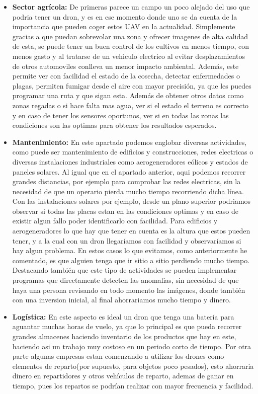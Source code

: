 \begin{itemize}
	\item \textbf{Sector agr\'icola:} De primeras parece un campo un poco alejado del uso que podria tener un dron, y es en ese momento donde uno se da cuenta de la importancia que pueden coger estos UAV en la actualidad. Simplemente gracias a que puedan sobrevolar una zona y ofrecer imagenes de alta calidad de esta, se puede tener un buen control de los cultivos en menos tiempo, con menos gasto y al tratarse de un vehiculo electrico al evitar desplazamientos de otros automoviles conlleva un menor impacto ambiental. Adem\'as, este permite ver con facilidad el estado de la cosecha, detectar enfermedades o plagas, permiten fumigar desde el aire con mayor precisi\'on, ya que les puedes programar una ruta y que sigan esta. Adem\'as de obtener otros datos como zonas regadas o si hace falta mas agua, ver si el estado el terreno es correcto y en caso de tener los sensores oportunos, ver si en todas las zonas las condiciones son las optimas para obtener los resultados esperados.  
	
\item \textbf{Mantenimiento:} En este apartado podemos englobar diversas actividades, como puede ser mantenimiento de edificios y construcciones, redes electricas o diversas instalaciones industriales como aerogeneradores e\'olicos y estados de paneles solares. Al igual que en el apartado anterior, aqui podemos recorrer grandes distancias, por ejemplo para comprobar las redes electricas, sin la necesidad de que un operario pierda mucho tiempo recorriendo dicha l\'inea. Con las instalaciones solares por ejemplo, desde un plano superior podriamos observar si todas las placas estan en las condiciones optimas y en caso de existir algun fallo poder identificarlo con facilidad. Para edificios y aerogeneradores lo que hay que tener en cuenta es la altura que estos pueden tener, y a la cual con un dron llegar\'iamos con facilidad y observar\'iamos si hay algun problema. En estos casos lo que evitamos, como anteriormente he comentado, es que alguien tenga que ir sitio a sitio perdiendo mucho tiempo. Destacando tambi\'en que este tipo de actividades se pueden implementar programas que directamente detecten las anomalias, sin necesidad de que haya una persona revisando en todo momento las im\'agenes, donde tambi\'en con una inversion inicial, al final ahorrariamos mucho tiempo y dinero. 
	
\item \textbf{Log\'istica:} En este aspecto es ideal un dron que tenga una bater\'ia para aguantar muchas horas de vuelo, ya que lo principal es que pueda recorrer grandes almacenes haciendo inventario de los productos que hay en este, haciendo asi un trabajo muy costoso en un periodo corto de tiempo. 
\hspace{1 cm} Por otra parte algunas empresas estan comenzando a utilizar los drones como elementos de reparto(por supuesto, para objetos poco pesados), esto ahorraria dinero en repartidores y otros veh\'iculos de reparto, ademas de ganar en tiempo, pues los repartos se podr\'ian realizar con mayor frecuencia y facilidad.

\end{itemize}

